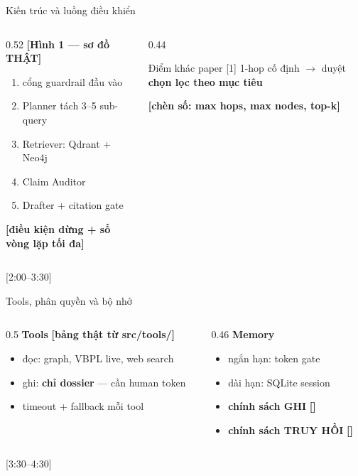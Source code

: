 \documentclass[aspectratio=169,10pt]{beamer}
\newcommand{\TODO}[1]{\textcolor{accent}{\textbf{[#1]}}}
\newcommand{\warn}[1]{\textcolor{bad}{\textbf{#1}}}
\newcommand{\tm}[1]{\hfill{\scriptsize\color{gray}[#1]}}
\begin{document}
\begin{frame}{Kiến trúc và luồng điều khiển}
  \begin{columns}[T]
    \begin{column}{0.52\textwidth}
      \TODO{\textbf{Hình 1 — sơ đồ THẬT}}
      \vspace{0.3em}
      \begin{enumerate}
        \item cổng guardrail đầu vào
        \item Planner tách 3--5 sub-query
        \item Retriever: Qdrant + Neo4j
        \item Claim Auditor
        \item Drafter + citation gate
      \end{enumerate}
      \TODO{điều kiện dừng + số vòng lặp tối đa}
    \end{column}
    \begin{column}{0.44\textwidth}
      \begin{block}{Điểm khác paper [1]}
        1-hop cố định $\rightarrow$ duyệt \textbf{chọn lọc theo mục tiêu}
      \end{block}
      \TODO{chèn số: max hops, max nodes, top-k}
    \end{column}
  \end{columns}
  \tm{2:00–3:30}
\end{frame}

\begin{frame}{Tools, phân quyền và bộ nhớ}
  \begin{columns}[T]
    \begin{column}{0.5\textwidth}
      \textbf{Tools} \TODO{bảng thật từ src/tools/}
      \begin{itemize}
        \item đọc: graph, VBPL live, web search
        \item ghi: \warn{chỉ dossier} — cần human token
        \item timeout + fallback mỗi tool
      \end{itemize}
    \end{column}
    \begin{column}{0.46\textwidth}
      \textbf{Memory}
      \begin{itemize}
        \item ngắn hạn: token gate
        \item dài hạn: SQLite session
        \item \textbf{chính sách GHI} \TODO{}
        \item \textbf{chính sách TRUY HỒI} \TODO{}
      \end{itemize}
    \end{column}
  \end{columns}
  \tm{3:30–4:30}
\end{frame}
\end{document}
